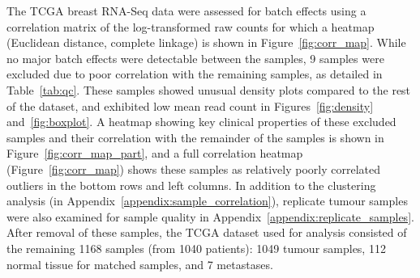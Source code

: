 The TCGA breast RNA-Seq data were assessed for batch effects using a correlation matrix of the log-transformed raw counts for which a heatmap (Euclidean distance, complete linkage) is shown in Figure~\ref{fig:corr_map}. While no major batch effects were detectable between the samples, 9 samples were excluded due to poor correlation with the remaining samples, as detailed in Table~\ref{tab:qc}. These samples showed unusual density plots compared to the rest of the dataset, and exhibited low mean read count in Figures~\ref{fig:density} and~\ref{fig:boxplot}. A heatmap showing key clinical properties of these excluded samples and their correlation with the remainder of the samples is shown in Figure~\ref{fig:corr_map_part}, and a full correlation heatmap (Figure~\ref{fig:corr_map}) shows these samples as relatively poorly correlated outliers in the bottom rows and left columns.
In addition to the clustering analysis (in Appendix~\ref{appendix:sample_correlation}), replicate tumour samples were also examined for sample quality in Appendix~\ref{appendix:replicate_samples}.
After removal of these samples, the TCGA dataset used for analysis consisted of the remaining 1168 samples (from 1040 patients): 1049 tumour samples, 112 normal tissue for matched samples, and 7 metastases.



